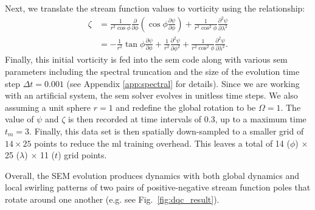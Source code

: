 \documentclass[aps,pra,a4paper,twocolumn,longbibliography,groupedaddress]{revtex4-2}
\begin{document}
Next, we translate the stream function values to vorticity using the relationship:
%
\begin{equation}\label{eqn:zeta_wrt_psi}
\begin{split}
    \zeta &= \frac{1}{r^2 \cos\phi} \frac{\partial}{\partial \phi}\left(\cos\phi \frac{\partial \psi}{\partial \phi}\right) + \frac{1}{r^2\cos^2\phi}\frac{\partial^2 \psi}{\partial \lambda^2} \\
    &= -\frac{1}{r^2}\tan\phi\frac{\partial \psi}{\partial \phi} + \frac{1}{r^2}\frac{\partial^2 \psi}{\partial \phi^2} + \frac{1}{r^2\cos^2\phi}\frac{\partial^2 \psi}{\partial \lambda^2}.
\end{split}
\end{equation}
%
Finally, this initial vorticity is fed into the \gls{sem} code along with various \gls{sem} parameters including the spectral truncation and the size of the evolution time step $\Delta t = 0.001$ (see Appendix \ref{app:spectral} for details).
Since we are working with an artificial system, the \gls{sem} solver evolves in unitless time steps. We also assuming a unit sphere $r=1$ and redefine the global rotation to be $\Omega=1$. 
The value of $\psi$ and $\zeta$ is then recorded at time intervals of 0.3, up to a maximum time $t_m = 3$. Finally, this data set is then spatially down-sampled to a smaller grid of $14 \times 25$ points to reduce the \gls{ml} training overhead. This leaves a total of 14 ($\phi$) $\times$ 25 ($\lambda$) $\times$  11 ($t$) grid points.

Overall, the SEM evolution produces dynamics with both global dynamics and local swirling patterns of two pairs of positive-negative stream function poles that rotate around one another (e.g. see Fig.~\ref{fig:dqc_result}).


\end{document}
